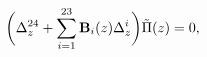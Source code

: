 \begin{equation}
\label{eq:PFform}
\biggl(\Delta_z^{24}+\sum_{i=1}^{23}{\bf B}_i(z)\Delta_z^i\biggr)\tilde{\Pi}(z)
=0,
\end{equation}

